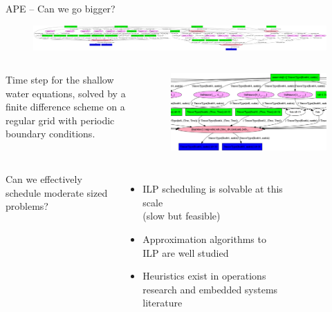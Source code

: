 \documentclass[9pt, compress, blue]{beamer}
\begin{document}
\begin{frame}{APE -- Can we go bigger?}
\begin{figure}[ht]
\vspace{-0pt}
\centering
\includegraphics[width=\textwidth]{f_timeEvolutionScanOp_18}
\end{figure}
\vspace{-10pt}

\begin{columns}
Time step for the shallow water equations, solved
by a finite difference scheme on a regular grid with periodic boundary
conditions.

\begin{figure}[ht]
\vspace{-0pt}
\centering
\includegraphics[width=\textwidth]{f_timeEvolutionScanOp_18_cropped}
\vspace{-0pt}
\vspace{00pt}
\end{figure}
\end{columns}

\vspace{-7pt}

\begin{columns}
Can we effectively schedule moderate sized problems?
\begin{itemize}
\item ILP scheduling is solvable at this scale\\ (slow but feasible)
\item Approximation algorithms to ILP are well studied
\item Heuristics exist in operations research and embedded systems literature 
\end{itemize}
\begin{figure}
\end{figure}
\end{columns}
\end{frame}
\end{document}
